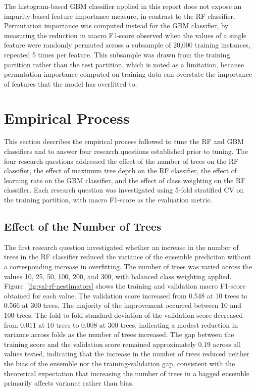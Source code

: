 \documentclass[conference,10pt]{IEEEtran}
\begin{document}
The histogram-based GBM classifier applied in this report does not expose an impurity-based feature importance measure, in contrast to the RF classifier. Permutation importance was computed instead for the GBM classifier, by measuring the reduction in macro F1-score observed when the values of a single feature were randomly permuted across a subsample of 20,000 training instances, repeated 5 times per feature. This subsample was drawn from the training partition rather than the test partition, which is noted as a limitation, because permutation importance computed on training data can overstate the importance of features that the model has overfitted to.

\section{Empirical Process}
\label{sec:empirical}
This section describes the empirical process followed to tune the RF and GBM classifiers and to answer four research questions established prior to tuning. The four research questions addressed the effect of the number of trees on the RF classifier, the effect of maximum tree depth on the RF classifier, the effect of learning rate on the GBM classifier, and the effect of class weighting on the RF classifier. Each research question was investigated using 5-fold stratified CV on the training partition, with macro F1-score as the evaluation metric.

\subsection{Effect of the Number of Trees}
The first research question investigated whether an increase in the number of trees in the RF classifier reduced the variance of the ensemble prediction without a corresponding increase in overfitting. The number of trees was varied across the values 10, 25, 50, 100, 200, and 300, with balanced class weighting applied. Figure~\ref{fig:val-rf-nestimators} shows the training and validation macro F1-score obtained for each value. The validation score increased from 0.548 at 10 trees to 0.566 at 300 trees. The majority of the improvement occurred between 10 and 100 trees. The fold-to-fold standard deviation of the validation score decreased from 0.011 at 10 trees to 0.008 at 300 trees, indicating a modest reduction in variance across folds as the number of trees increased. The gap between the training score and the validation score remained approximately 0.19 across all values tested, indicating that the increase in the number of trees reduced neither the bias of the ensemble nor the training-validation gap, consistent with the theoretical expectation that increasing the number of trees in a bagged ensemble primarily affects variance rather than bias.
\end{document}
